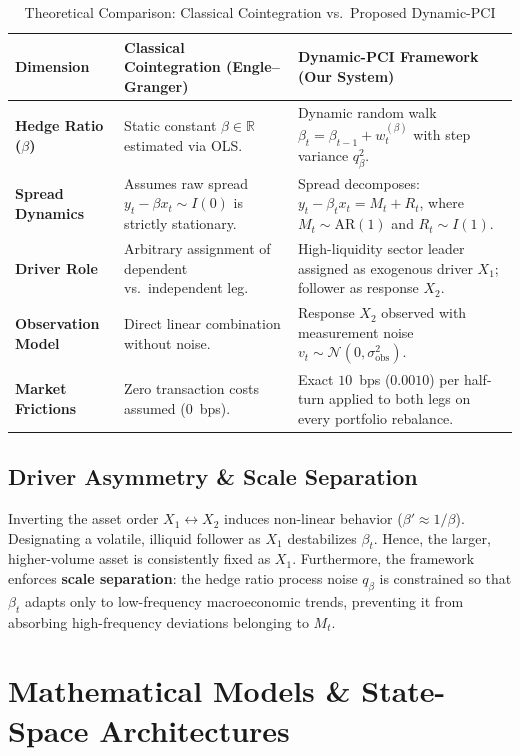 \documentclass[11pt, a4paper]{article}
\begin{document}
\begin{table}[h]
\centering\small
\caption{Theoretical Comparison: Classical Cointegration vs.\ Proposed Dynamic-PCI}
\label{tab:theory_comp}
\begin{tabularx}{\textwidth}{lXX}
\toprule
\textbf{Dimension} & \textbf{Classical Cointegration (Engle--Granger)} & \textbf{Dynamic-PCI Framework (Our System)} \\
\midrule
\textbf{Hedge Ratio ($\beta$)} & Static constant $\beta \in \mathbb{R}$ estimated via OLS. & Dynamic random walk $\beta_t = \beta_{t-1} + w_t^{(\beta)}$ with step variance $q_\beta^2$. \\
\addlinespace
\textbf{Spread Dynamics} & Assumes raw spread $y_t - \beta x_t \sim I(0)$ is strictly stationary. & Spread decomposes: $y_t - \beta_t x_t = M_t + R_t$, where $M_t \sim \text{AR}(1)$ and $R_t \sim I(1)$. \\
\addlinespace
\textbf{Driver Role} & Arbitrary assignment of dependent vs.\ independent leg. & High-liquidity sector leader assigned as exogenous driver $X_1$; follower as response $X_2$. \\
\addlinespace
\textbf{Observation Model} & Direct linear combination without noise. & Response $X_2$ observed with measurement noise $v_t \sim \mathcal{N}(0, \sigma_{\text{obs}}^2)$. \\
\addlinespace
\textbf{Market Frictions} & Zero transaction costs assumed ($0$~bps). & Exact $10$~bps ($0.0010$) per half-turn applied to both legs on every portfolio rebalance. \\
\bottomrule
\end{tabularx}
\end{table}

\subsection{Driver Asymmetry \& Scale Separation}
Inverting the asset order $X_1 \leftrightarrow X_2$ induces non-linear behavior ($\beta' \approx 1/\beta$). Designating a volatile, illiquid follower as $X_1$ destabilizes $\beta_t$. Hence, the larger, higher-volume asset is consistently fixed as $X_1$. Furthermore, the framework enforces \textbf{scale separation}: the hedge ratio process noise $q_\beta$ is constrained so that $\beta_t$ adapts only to low-frequency macroeconomic trends, preventing it from absorbing high-frequency deviations belonging to $M_t$.

\section{Mathematical Models \& State-Space Architectures}
\end{document}
